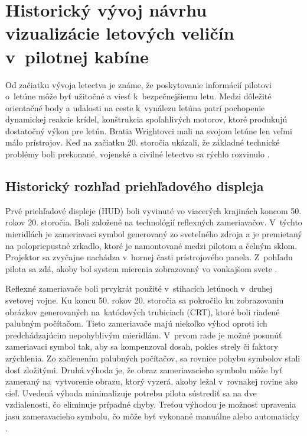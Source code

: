 \chapter{Historický vývoj návrhu vizualizácie letových veličín v~pilotnej kabíne} 
\label{struktura}
Od začiatku vývoja letectva je známe, že poskytovanie informácií pilotovi o~letúne môže byť užitočné a viesť k~bezpečnejšiemu letu. Medzi dôležité orientačné body a udalosti na ceste k~vynálezu letúna patrí pochopenie dynamickej reakcie krídel, konštrukcia spoľahlivých motorov, ktoré produkujú dostatočný výkon pre letún. Bratia Wrightovci mali na svojom letúne len veľmi málo prístrojov. Keď na začiatku 20. storočia ukázali, že základné technické problémy boli prekonané, vojenské a civilné letectvo sa rýchlo rozvinulo \cite{historia}.

\section{Historický rozhľad priehľadového displeja}
Prvé priehľadové displeje (HUD) boli vyvinuté vo viacerých krajinách koncom 50. rokov 20. storočia. Boli založené na technológií reflexných zameriavačov. V~týchto mieridlách je zameriavaci symbol generovaný zo svetelného zdroja a je premietaný na polopriepustné zrkadlo, ktoré je namontované medzi pilotom a čelným sklom. Projektor sa zvyčajne nachádza v~hornej časti prístrojového panela. Z~pohľadu pilota sa zdá, akoby bol system mierenia zobrazovaný vo vonkajšom svete \cite{HUDkniha}. 

Reflexné zameriavače boli prvykrát použité v~stíhacích letúnoch v~druhej svetovej vojne. Ku koncu 50. rokov 20. storočia sa pokročilo ku zobrazovaniu obrázkov generovaných na~katódových trubiciach (CRT), ktoré boli riadené palubným počítačom. Tieto zameriavače majú niekoľko výhod oproti ich predchádzajúcim nepohyblivým mieridlám. V~prvom rade je možné posunúť zameriavaci symbol tak, aby sa kompenzoval dosah, pokles strely či faktory zrýchlenia. Zo začlenením palubných počítačov, sa rovnice pohybu symbolov stali dosť zložitými. Druhá výhoda je, že obraz zameriavacieho symbolu môže byť zameraný na~vytvorenie obrazu, ktorý vyzerá, akoby ležal v~rovnakej rovine ako cieľ. Uvedená výhoda minimalizuje potrebu pilota sústrediť sa na dve vzdialenosti, čo eliminuje prípadné chyby. Treťou výhodou je možnosť upravenia jasu zameravacieho symbolu, čo môže byť vykonané manuálne alebo automaticky \cite{HUDkniha}.

